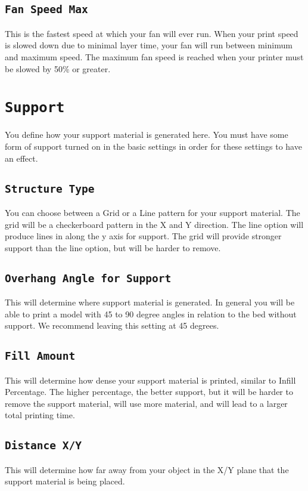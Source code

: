 \subsection{\texttt{Fan Speed Max}}
This is the fastest speed at which your fan will ever run. When your print speed is slowed down due to minimal layer time, your fan will run between minimum and maximum speed. The maximum fan speed is reached when your printer must be slowed by 50\% or greater.

\section{\texttt{Support}}
You define how your support material is generated here. You must have some form of support turned on in the basic settings in order for these settings to have an effect.

\subsection{\texttt{Structure Type}}
You can choose between a Grid or a Line pattern for your support material. The grid will be a checkerboard pattern in the X and Y direction. The line option will produce lines in along the y axis for support. The grid will provide stronger support than the line option, but will be harder to remove.

\subsection{\texttt{Overhang Angle for Support}}
This will determine where support material is generated. In general you will be able to print a model with 45 to 90 degree angles in relation to the bed without support. We recommend leaving this setting at 45 degrees.

\subsection{\texttt{Fill Amount}}
This will determine how dense your support material is printed, similar to Infill Percentage. The higher percentage, the better support, but it will be harder to remove the support material, will use more material, and will lead to a larger total printing time.

\subsection{\texttt{Distance X/Y}}
This will determine how far away from your object in the X/Y plane that the support material is being placed.

